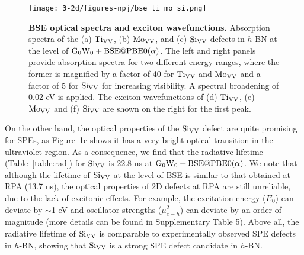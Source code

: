 \begin{figure}[ht!]
    \centering
    \texttt{[image: 3-2d/figures-npj/bse\_ti\_mo\_si.png]}
    \caption{
    \textbf{BSE optical spectra and exciton wavefunctions.} Absorption spectra  of the (a) $\text{Ti}_{\text{V}\text{V}}$, (b) $\text{Mo}_{\text{V}\text{V}}$, and (c) $\text{Si}_{\text{V}\text{V}}$ defects in $h$-BN at the level of $\text{G}_0\text{W}_0+\text{BSE}@\text{PBE0($\mathrm{\alpha}$)}$. The left and right panels provide absorption spectra for two different energy ranges, where the former is magnified by a factor of 40 for $\text{Ti}_{\text{V}\text{V}}$ and $\text{Mo}_{\text{V}\text{V}}$ and a factor of 5 for $\text{Si}_{\text{V}\text{V}}$ for increasing visibility. A spectral broadening of 0.02 eV is applied. The exciton wavefunctions of (d) $\text{Ti}_{\text{V}\text{V}}$, (e) $\text{Mo}_{\text{V}\text{V}}$ and (f) $\text{Si}_{\text{V}\text{V}}$ are shown on the right for the first peak.
    }
    \label{fig:bse}
\end{figure}

On the other hand, the optical properties of the $\text{Si}_{\text{V}\text{V}}$ defect are quite promising for SPEs, as Figure~\ref{fig:bse}c shows it has a very bright optical transition in the ultraviolet region. As a consequence, we find that the radiative lifetime (Table~\ref{table:rad}) for $\text{Si}_{\text{V}\text{V}}$ is 22.8 ns at $\rm G_0W_0+BSE@PBE0(\alpha)$.
We note that although the lifetime of $\text{Si}_{\text{V}\text{V}}$ at the level of BSE is similar to that obtained at RPA (13.7 ns),
the optical properties of 2D defects at RPA are still unreliable, due to the lack of excitonic effects. For example, the excitation energy ($E_0$) can deviate by $\sim$1 eV and oscillator strengths ($\mu_{e-h}^2$) can deviate by an order of magnitude (more details can be found in Supplementary Table 5).
Above all, the radiative lifetime of $\text{Si}_{\text{V}\text{V}}$ is comparable to experimentally observed SPE defects in $h$-BN,\cite{schell2017coupling} showing that $\text{Si}_{\text{V}\text{V}}$ is a strong SPE defect candidate in $h$-BN.




